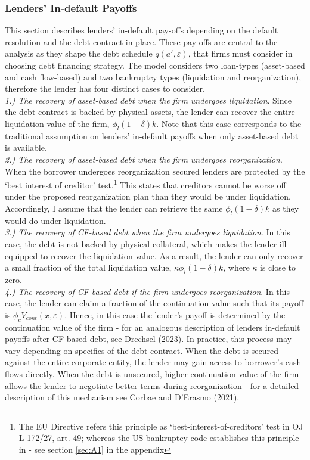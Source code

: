 \documentclass[12pt]{article}
\begin{document}
\subsubsection{Lenders' In-default Payoffs}   \label{sec:Default Payoffs}
This section describes lenders' in-default pay-offs depending on the default resolution and the debt contract in place. These pay-offs are central to the analysis as they shape the debt schedule $q(a', \varepsilon)$, that firms must consider in choosing debt financing strategy. The model considers two loan-types (asset-based and cash flow-based) and two bankruptcy types (liquidation and reorganization), therefore the lender has four distinct cases to consider. \vspace{3mm} \\
\textit{ 1.) The recovery of asset-based debt when the firm undergoes liquidation}. Since the debt contract is backed by physical assets, the lender can recover the entire liquidation value of the firm, $\phi_l(1-\delta)k$. Note that this case corresponds to the traditional assumption on lenders' in-default payoffs when only asset-based debt is available.  \vspace{3mm} \\
\textit{ 2.) The recovery of asset-based debt when the firm undergoes reorganization}. When the borrower undergoes reorganization secured lenders are protected by the ‘best interest of creditor’ test.\footnote{The EU Directive refers this principle as ‘best-interest-of-creditors’ test in OJ L 172/27, art. 49; whereas the US bankruptcy code establishes this principle in - see section \ref{sec:A1} in the appendix} This states that creditors cannot be worse off under the proposed reorganization plan than they would be under liquidation. Accordingly, I assume that the lender can retrieve the same $\phi_l(1-\delta)k$ as they would do under liquidation. \vspace{3mm} \\
\textit{ 3.) The recovery of CF-based debt when the firm undergoes liquidation}. In this case, the debt is not backed by physical collateral, which makes the lender ill-equipped to recover the liquidation value.  As a result, the lender can only recover a small fraction of the total liquidation value, $\kappa \phi_l(1-\delta)k$, where $\kappa$ is close to zero. \vspace{3mm} \\
\textit{ 4.) The recovery of CF-based debt if the firm undergoes reorganization}. In this case, the lender can claim a fraction of the continuation value such that its payoff is $\phi_c V_{cont}(x,\varepsilon)$. Hence, in this case the lender's payoff is determined by the continuation value of the firm - for an analogous description of lenders in-default payoffs after CF-based debt, see Drechsel (2023). In practice, this process may vary depending on specifics of the debt contract. When the debt is secured against the entire corporate entity, the lender may gain access to borrower's cash flows directly. When the debt is unsecured, higher continuation value of the firm allows the lender to negotiate better terms during reorganization - for a detailed description of this mechanism see Corbae and D'Erasmo (2021). \vspace{3mm} \\
\end{document}

